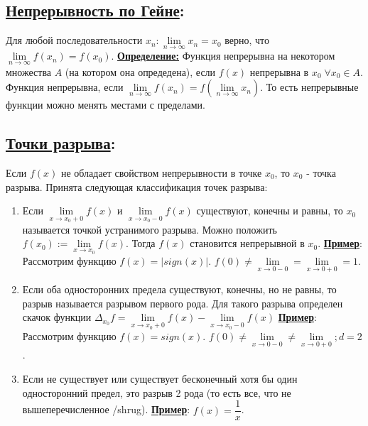 \documentclass{article}
\DeclareMathOperator{\Forall}{\forall}
\newcommand\abs[1]{\left|#1\right|}
\begin{document}
   \subsection*{\underline{Непрерывность по Гейне}:}
       Для любой последовательности $x_n\colon \lim\limits_{n\to\infty} x_n = x_0$ верно, что $\lim\limits_{n\to\infty} f(x_n) = f(x_0)$.\newline
   \textbf{\underline{Определение:}} Функция непрерывна на некотором множества $A$ (на котором она опредедена), если $f(x)$ непрерывна в $x_0 \;\Forall x_0\in A$.\newline
   Функция непрерывна, если $\lim\limits_{n\to\infty} f(x_n) = f\left(\lim\limits_{n\to\infty} x_n\right)$. То есть непрерывные функции можно менять местами с пределами.\newline
   
   \subsection*{\underline{Точки разрыва}:}
   Если $f(x)$ не обладает свойством непрерывности в точке $x_0$, то $x_0$ - точка разрыва. Принята следующая классификация точек разрыва:
   \begin{enumerate}
       \item Если $\lim\limits_{x\to x_0 + 0} f(x)$ и $\lim\limits_{x\to x_0 - 0} f(x)$ существуют, конечны и равны, то $x_0$ называется точкой устранимого разрыва. Можно положить $f(x_0) := \lim\limits_{x\to x_0} f(x)$. Тогда $f(x)$ становится непрерывной в $x_0$.\newline
       \textbf{\underline{Пример}}: Рассмотрим функцию $f(x) = \abs{sign(x)}$. $f(0) \neq \lim\limits_{x\to 0 - 0} = \lim\limits_{x\to 0 + 0} = 1$.
       
       \item Если оба односторонних предела существуют, конечны, но не равны, то разрыв называется разрывом первого рода. Для такого разрыва определен скачок функции $\Delta_{x_0} f = \lim\limits_{x\to x_0 + 0} f(x) - \lim\limits_{x\to x_0 - 0} f(x)$\newline
       \textbf{\underline{Пример}}: Рассмотрим функцию $f(x) = sign(x)$. $f(0) \neq \lim\limits_{x\to 0 - 0} \neq \lim\limits_{x\to 0 + 0}; d = 2$.
       
       \item Если не существует или существует бесконечный хотя бы один односторонний предел, это разрыв 2 рода (то есть все, что не вышеперечисленное /shrug).\newline
       \textbf{\underline{Пример}}: $f(x) = \dfrac{1}{x}$.
   \end{enumerate}
   
\end{document}
